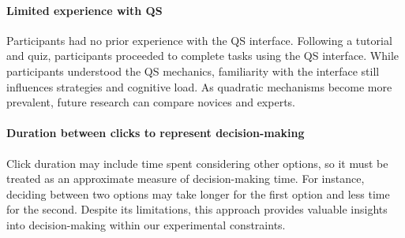 \paragraph{Limited experience with QS}
Participants had no prior experience with the QS interface. Following a tutorial and quiz, participants proceeded to complete tasks using the QS interface. While participants understood the QS mechanics, familiarity with the interface still influences strategies and cognitive load. As quadratic mechanisms become more prevalent, future research can compare novices and experts.

\paragraph{Duration between clicks to represent decision-making}
Click duration may include time spent considering other options, so it must be treated as an approximate measure of decision-making time. For instance, deciding between two options may take longer for the first option and less time for the second. Despite its limitations, this approach provides valuable insights into decision-making within our experimental constraints.

% 




